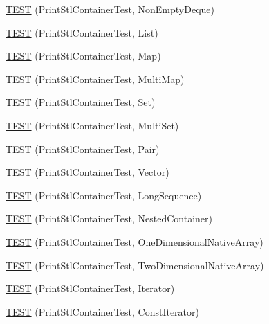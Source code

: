 \begin{DoxyCompactItemize}
\item 
\mbox{\hyperlink{namespacetesting_1_1gtest__printers__test_a249d482cf4a1525bd043489dcbd3e200}{T\+E\+ST}} (Print\+Stl\+Container\+Test, Non\+Empty\+Deque)
\item 
\mbox{\hyperlink{namespacetesting_1_1gtest__printers__test_aaa135672ff79ecaef82c6046f2ab8d29}{T\+E\+ST}} (Print\+Stl\+Container\+Test, List)
\item 
\mbox{\hyperlink{namespacetesting_1_1gtest__printers__test_a3d701a1866f260a42411e9041894c49c}{T\+E\+ST}} (Print\+Stl\+Container\+Test, Map)
\item 
\mbox{\hyperlink{namespacetesting_1_1gtest__printers__test_a8a498c956a5b1c0358d126e1ad56fac0}{T\+E\+ST}} (Print\+Stl\+Container\+Test, Multi\+Map)
\item 
\mbox{\hyperlink{namespacetesting_1_1gtest__printers__test_abdc498462741033074f8e86b7c0bd480}{T\+E\+ST}} (Print\+Stl\+Container\+Test, Set)
\item 
\mbox{\hyperlink{namespacetesting_1_1gtest__printers__test_adaa3e1cfa3feca377b3958edb41fc0f1}{T\+E\+ST}} (Print\+Stl\+Container\+Test, Multi\+Set)
\item 
\mbox{\hyperlink{namespacetesting_1_1gtest__printers__test_ad5d3e873b00c1c9e3f5924e106dd7831}{T\+E\+ST}} (Print\+Stl\+Container\+Test, Pair)
\item 
\mbox{\hyperlink{namespacetesting_1_1gtest__printers__test_abfab1ea62f0285c0cdbcca500be0dac8}{T\+E\+ST}} (Print\+Stl\+Container\+Test, Vector)
\item 
\mbox{\hyperlink{namespacetesting_1_1gtest__printers__test_a55eca253f3365ad26183bcc711cb257a}{T\+E\+ST}} (Print\+Stl\+Container\+Test, Long\+Sequence)
\item 
\mbox{\hyperlink{namespacetesting_1_1gtest__printers__test_ad8fb463805baecdfb95154dec6ec4f27}{T\+E\+ST}} (Print\+Stl\+Container\+Test, Nested\+Container)
\item 
\mbox{\hyperlink{namespacetesting_1_1gtest__printers__test_a6dd59bbdea483f662fe62e2c55c106ce}{T\+E\+ST}} (Print\+Stl\+Container\+Test, One\+Dimensional\+Native\+Array)
\item 
\mbox{\hyperlink{namespacetesting_1_1gtest__printers__test_aca371c218e2248562ed258eaf385f4d1}{T\+E\+ST}} (Print\+Stl\+Container\+Test, Two\+Dimensional\+Native\+Array)
\item 
\mbox{\hyperlink{namespacetesting_1_1gtest__printers__test_a01ec32faf0032f9fbcf4895d8d6e4aa9}{T\+E\+ST}} (Print\+Stl\+Container\+Test, Iterator)
\item 
\mbox{\hyperlink{namespacetesting_1_1gtest__printers__test_a3b54f9a039804190b7ff2e818169c0f2}{T\+E\+ST}} (Print\+Stl\+Container\+Test, Const\+Iterator)

\end{DoxyCompactItemize}
